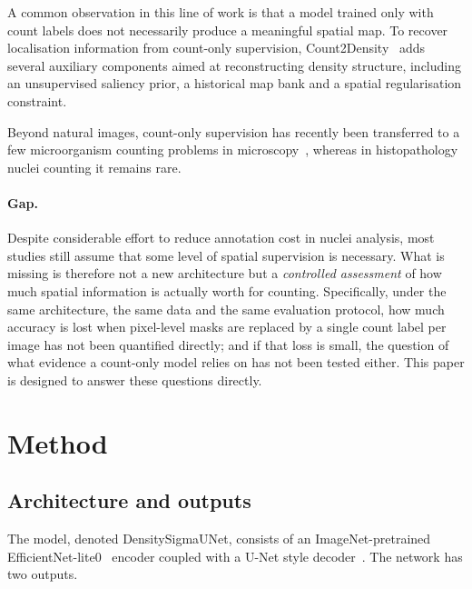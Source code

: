 \documentclass[pdflatex,sn-mathphys-num]{sn-jnl}
\begin{document}
A common observation in this line of work is that a model trained only with count labels does not necessarily
produce a meaningful spatial map. To recover localisation information from count-only supervision,
Count2Density~\cite{count2density} adds several auxiliary components aimed at reconstructing density structure,
including an unsupervised saliency prior, a historical map bank and a spatial regularisation constraint.

Beyond natural images, count-only supervision has recently been transferred to a few microorganism counting
problems in microscopy~\cite{microvit}, whereas in histopathology nuclei counting it remains rare.

\paragraph{Gap.} Despite considerable effort to reduce annotation cost in nuclei analysis, most studies still
assume that some level of spatial supervision is necessary. What is missing is therefore not a new
architecture but a \emph{controlled assessment} of how much spatial information is actually worth for counting.
Specifically, under the same architecture, the same data and the same evaluation protocol, how much accuracy is
lost when pixel-level masks are replaced by a single count label per image has not been quantified directly;
and if that loss is small, the question of what evidence a count-only model relies on has not been tested
either. This paper is designed to answer these questions directly.

\section{Method}\label{sec:method}

\subsection{Architecture and outputs}
The model, denoted DensitySigmaUNet, consists of an ImageNet-pretrained EfficientNet-lite0~\cite{efficientnet}
encoder coupled with a U-Net style decoder~\cite{unet}. The network has two outputs.
\end{document}
